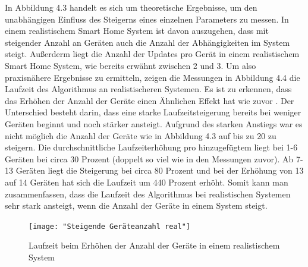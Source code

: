 \FloatBarrier
In Abbildung 4.3 handelt es sich um theoretische Ergebnisse, um den unabhängigen Einfluss des Steigerns eines einzelnen Parameters zu messen. In einem realistischem Smart Home System
ist davon auszugehen, dass mit steigender Anzahl an Geräten auch die Anzahl
der Abhängigkeiten im System steigt. Außerderm liegt die Anzahl der Updates pro Gerät in einem realistischem  Smart Home System, wie bereits erwähnt zwischen 2 und 3. Um also
praxisnähere Ergebnisse zu ermitteln, zeigen die Messungen in Abbildung 4.4 die Laufzeit des Algorithmus an realistischeren Systemen.
Es ist zu erkennen, dass das Erhöhen der Anzahl der Geräte einen Ähnlichen Effekt hat wie zuvor . Der Unterschied besteht darin, dass
eine starke Laufzeitsteigerung bereits bei weniger Geräten beginnt und noch stärker ansteigt. Aufgrund des starken Anstiegs war es nicht möglich die Anzahl der Geräte wie in Abbildung
4.3 auf bis zu 20 zu steigern. 
Die durchschnittliche Laufzeiterhöhung pro hinzugefügtem liegt bei 1-6 Geräten bei circa 30 Prozent (doppelt so viel wie in den Messungen zuvor).
Ab 7-13 Geräten liegt die Steigerung bei circa 80 Prozent und bei der Erhöhung von 13 auf 14
Geräten hat sich die Laufzeit um 440 Prozent erhöht. Somit kann man zusammenfassen, dass die Laufzeit des Algorithmus bei realistischen Systemen sehr stark ansteigt, wenn
die Anzahl der Geräte in einem System steigt.   
\begin{figure}[h]
\begin{center}
\texttt{[image: "Steigende Geräteanzahl real"]}
\caption{Laufzeit beim Erhöhen der Anzahl der Geräte in einem realistischem System}
\label{fig:Prob1:MEA}
\end{center}
\end{figure}

